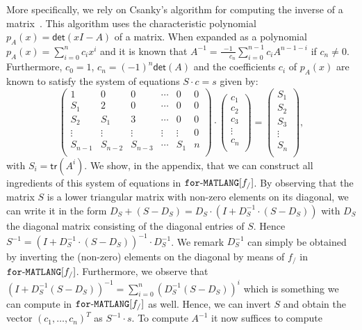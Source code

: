 More specifically, we rely on Csanky's algorithm for computing the inverse of a matrix~\cite{Csanky76}. This algorithm uses the characteristic
polynomial $p_A(x)=\mathsf{det}(xI-A)$ of a matrix. When expanded as a polynomial
$p_A(x)=\sum_{i=0}^{n} c_i x^i$ and it is known that $A^{-1}=\frac{-1}{\phantom{-1}c_n}\sum_{i=0}^{n-1}c_i A^{n-1-i}$
if $c_n\neq 0$. Furthermore, $c_0=1$, $c_n=(-1)^n\mathsf{det}(A)$ and the coefficients $c_i$ of $p_A(x)$
are known to satisfy the system of equations $S\cdot c=s$ given by:
$$
\left(\begin{matrix}
1 & 0 & 0 & \cdots & 0 & 0\\
S_1 & 2 & 0 & \cdots  &0 & 0\\
S_2 & S_1 & 3 & \cdots  &0 & 0\\
\vdots & \vdots & \vdots & \vdots & \vdots & 0\\
S_{n-1} & S_{n-2} & S_{n-3} & \cdots & S_1 & n\\
\end{matrix}\right)\cdot
\left(\begin{matrix}
c_1\\
c_2\\
c_3\\
\vdots\\
c_n\\
\end{matrix}\right)=\left(\begin{matrix}
S_1\\
S_2\\
S_3\\
\vdots\\
S_n\\
\end{matrix}\right),
$$
with $S_i=\mathsf{tr}(A^i)$. We show, in the appendix, that we can construct all ingredients of this system of equations in $\texttt{for}\text{-}\texttt{MATLANG}[f_/]$. By observing that the matrix $S$ is a lower triangular matrix with non-zero elements on its diagonal, we can write it in the form $D_S+(S-D_{S})=D_S\cdot(I+D_S^{-1}\cdot (S-D_S))$ with $D_S$ the diagonal matrix consisting of the diagonal entries of $S$.
Hence $S^{-1}=(I+D_{S}^{-1}\cdot(S-D_{S}))^{-1}\cdot D_S^{-1}$. 
We remark $D_S^{-1}$ can simply be obtained by inverting the (non-zero) elements on the diagonal by means of $f_/$ in $\texttt{for}\text{-}\texttt{MATLANG}[f_/]$. Furthermore, we observe that $(I+D_S^{-1}(S-D_S))^{-1}=\sum_{i=0}^{n}(D_S^{-1}(S-D_S))^i$ which is something
we can compute in $\texttt{for}\text{-}\texttt{MATLANG}[f_/]$ as well. Hence, we can invert $S$ and obtain the vector $(c_1,\ldots,c_n)^T$ as $S^{-1}\cdot s$. To compute $A^{-1}$ it now suffices to compute
